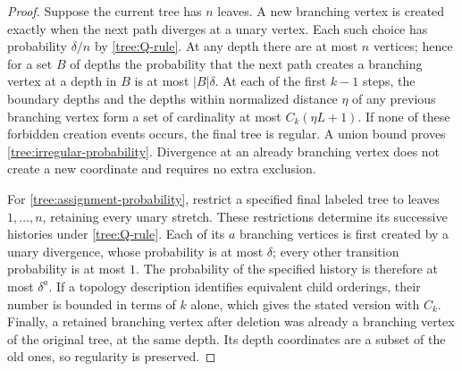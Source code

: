 
\begin{proof}
Suppose the current tree has $n$ leaves.  A new branching vertex is
created exactly when the next path diverges at a unary vertex.
Each such choice has probability $\delta/n$ by
\eqref{tree:Q-rule}.  At any depth there are at most $n$ vertices;
hence for a set $B$ of depths the probability that the next path
creates a branching vertex at a depth in $B$ is at most $|B|\delta$.
At each of the first $k-1$ steps, the boundary depths and the depths
within normalized distance $\eta$ of any previous branching vertex
form a set of cardinality at most $C_k(\eta L+1)$.  If none of these
forbidden creation events occurs, the final tree is regular.
A union bound proves \eqref{tree:irregular-probability}.  Divergence
at an already branching vertex does not create a new coordinate and
requires no extra exclusion.

For \eqref{tree:assignment-probability}, restrict a specified final
labeled tree to leaves $1,\ldots,n$, retaining every unary stretch.
These restrictions determine its successive histories under
\eqref{tree:Q-rule}.  Each of its $a$ branching vertices is first
created by a unary divergence, whose probability is at most
$\delta$; every other transition probability is at most $1$.
The probability of the specified history is therefore at most
$\delta^a$.  If a topology description identifies equivalent
child orderings, their number is bounded in terms of $k$ alone,
which gives the stated version with $C_k$.
Finally, a retained branching vertex after deletion was already a
branching vertex of the original tree, at the same depth.  Its depth
coordinates are a subset of the old ones, so regularity is preserved.
\end{proof}

